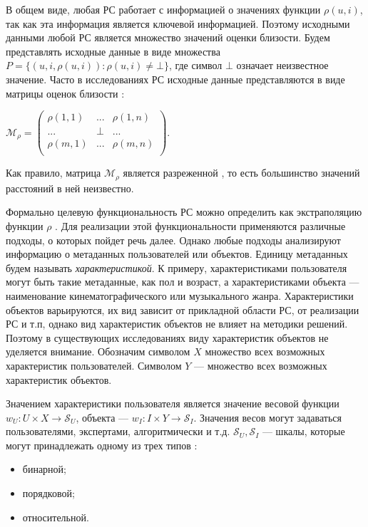 В общем виде, любая РС работает с информацией о значениях
функции $\rho(u, i)$, так как эта информация является
ключевой информацией. Поэтому исходными данными любой РС
является множество значений оценки близости.
Будем представлять исходные данные в виде множества
$P = \{(u, i, \rho(u, i)): \rho(u, i) \ne \bot\}$,
где символ $\bot$ означает неизвестное значение.
Часто в исследованиях РС исходные данные представляются в виде
матрицы оценок близости \cite{sparse1,sparse2,sparse3}:
\begin{center}
$\mathcal{M}_{\rho} =
\begin{pmatrix}
	\rho(1,1)& ... & \rho(1,n)  \\
	...      & \bot & ...  \\
	\rho(m,1)& ... & \rho(m, n)  \\
\end{pmatrix}$.\\
\end{center}
Как правило, матрица
$\mathcal{M}_{\rho}$ является разреженной \cite{sparse1, sparse2, sparse3},
то есть большинство
значений расстояний в ней неизвестно.

Формально целевую функциональность РС можно определить как
экстраполяцию функции $\rho$ \cite{toward}. Для реализации этой функциональности
применяются различные подходы, о которых пойдет речь далее. Однако
любые подходы анализируют информацию о метаданных пользователей или объектов.
Единицу метаданных будем называть {\it характеристикой}.
К примеру, характеристиками пользователя могут быть такие метаданные, как
пол и возраст, а характеристиками объекта --- наименование
кинематографического или музыкального жанра. Характеристики объектов
варьируются, их вид зависит от прикладной области РС, от реализации РС
и т.п, однако вид характеристик объектов не влияет на методики решений.
Поэтому в существующих исследованиях виду характеристик объектов не уделяется внимание.
Обозначим символом $X$ множество всех возможных характеристик пользователей.
Символом $Y$ --- множество всех возможных характеристик объектов.

Значением характеристики пользователя
является значение весовой функции $w_U: U \times X \rightarrow \mathcal{S}_U$,
объекта --- $w_I: I \times Y \rightarrow \mathcal{S}_I$. Значения весов могут задаваться
пользователями, экспертами, алгоритмически и т.д. $\mathcal{S}_U,
\mathcal{S}_I$ --- шкалы,
которые могут принадлежать одному из трех типов \cite{social_osipov}:
\begin{itemize}
\item бинарной;
\item порядковой;
\item относительной.
\end{itemize}

